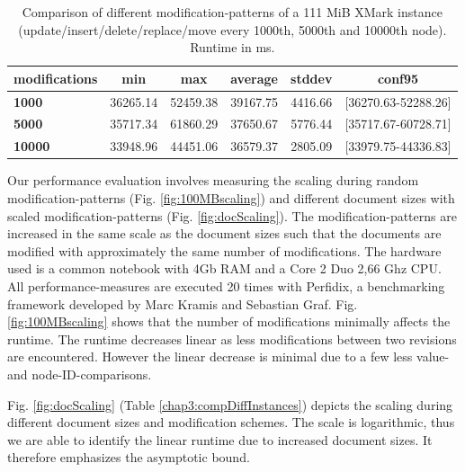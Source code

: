 \begin{table}[tb]
\centering 
\begin{tabular}[r]{|l|c|c|c|c|c|} 
\hline
\textbf{modifications} & \textbf{min} & \textbf{max} & \textbf{average} & \textbf{stddev} & \textbf{conf95}\\
\hline
\hline
\textbf{1000} & 36265.14 & 52459.38 & 39167.75 & 4416.66 & [36270.63-52288.26]\\
\hline
\textbf{5000} & 35717.34 & 61860.29 & 37650.67 & 5776.44 & [35717.67-60728.71]\\
\hline
\textbf{10000} & 33948.96 & 44451.06 & 36579.37 & 2805.09 & [33979.75-44336.83]\\
\hline
\end{tabular}
\label{chap3:comparison}
\vspace{0.5em} 
\caption{Comparison of different modification-patterns of a 111 MiB XMark instance (update/insert/delete/replace/move every 1000th, 5000th and 10000th node). Runtime in ms.}
\end{table}

Our performance evaluation involves measuring the scaling during random modification-patterns (Fig. \ref{fig:100MBscaling}) and different document sizes with scaled modi\-fication-patterns (Fig. \ref{fig:docScaling}). The modification-patterns are increased in the same scale as the document sizes such that the documents are modified with approximately the same number of modifications. The hardware used is a common notebook with 4Gb RAM and a Core 2 Duo 2,66 Ghz CPU. All performance-measures are executed 20 times with Perfidix\cite{kramis2007perfidix}, a benchmarking framework developed by Marc Kramis and Sebastian Graf. Fig. \ref{fig:100MBscaling} shows that the number of modifications minimally affects the runtime. The runtime decreases linear as less modifications between two revisions are encountered. However the linear decrease is minimal due to a few less value- and node-ID-comparisons.

Fig. \ref{fig:docScaling} (Table \ref{chap3:compDiffInstances}) depicts the scaling during different document sizes and modification schemes. The scale is logarithmic, thus we are able to identify the linear runtime due to increased document sizes. It therefore emphasizes the asymptotic bound.


